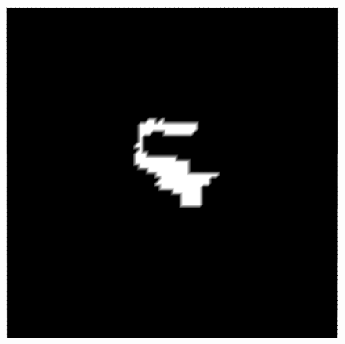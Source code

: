 \documentclass[a4paper,11pt,oneside]{article}%
\begin{document}
\begin{figure}[H]
   {\includegraphics[scale=0.21]{pics/cropT7_sauvola.png}}
    \hspace{5px}

\end{figure}
\end{document}
